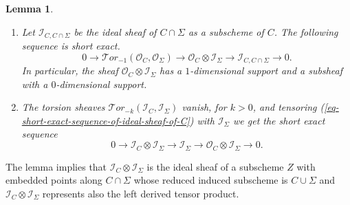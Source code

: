 \documentclass[12pt]{amsart}
\numberwithin{equation}{subsection}
\theoremstyle{plain}
\newtheorem{lem}[thm]{Lemma}
\theoremstyle{definition}
\newcommand{\StructureSheaf}[1]{{\mathcal O}_{#1}}
\newcommand{\SheafTor}{{\mathcal Tor}}
\newcommand{\Ideal}[1]{{\mathcal I}_{#1}}
\begin{document}
\begin{lem}
\label{lemma-vanishing-of-tor-sheaves}
\begin{enumerate}
\item
\label{lemma-item-Tor-1-embeds-in-tensor-product}
Let $\Ideal{C,C\cap \Sigma}$ be the ideal sheaf of $C\cap \Sigma$ as a subscheme of $C$. The following sequence is short exact.
\[
0\rightarrow \SheafTor_{-1}(\StructureSheaf{C},\StructureSheaf{\Sigma})
\rightarrow \StructureSheaf{C}\otimes \Ideal{\Sigma}\rightarrow \Ideal{C,C\cap \Sigma} \rightarrow 0.
\]
In particular, the  sheaf $\StructureSheaf{C}\otimes \Ideal{\Sigma}$ has a $1$-dimensional support and a subsheaf with a $0$-dimensional support.
\item
The torsion sheaves $\SheafTor_{-k}(\Ideal{C},\Ideal{\Sigma})$ vanish, for $k>0$, and tensoring (\ref{eq-short-exact-sequence-of-ideal-sheaf-of-C}) with $\Ideal{\Sigma}$ we get the short exact sequence
\begin{equation}
\label{eq-short-exact-sequence-of-tensor-product-of-two-ideal-sheaves}
0\rightarrow \Ideal{C}\otimes\Ideal{\Sigma}\rightarrow \Ideal{\Sigma}\rightarrow \StructureSheaf{C}\otimes\Ideal{\Sigma}\rightarrow 0.
\end{equation}
\end{enumerate}
\end{lem}

The lemma implies that $\Ideal{C}\otimes\Ideal{\Sigma}$ is the ideal sheaf of a subscheme $Z$ 
with embedded points along $C\cap\Sigma$ whose reduced induced subscheme is $C\cup\Sigma$ and $\Ideal{C}\otimes\Ideal{\Sigma}$ represents also the left derived tensor product.
\end{document}

